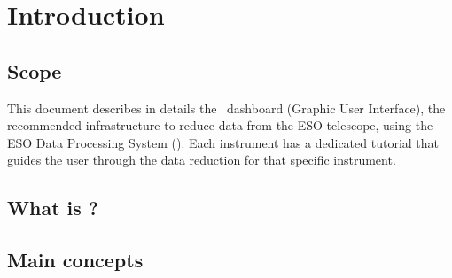\section{Introduction}

\subsection{Scope}

This document describes in details the \edpsgui\ dashboard (Graphic
User Interface), the recommended infrastructure to reduce data from
the ESO telescope, using the ESO Data Processing System
(\edps). Each instrument has a dedicated tutorial that guides the user
through the data reduction for that specific instrument.

\subsection{What is \edps?}
\label{sec:what_is_edps}


\subsection{Main concepts}
\label{sec:main_concepts}


